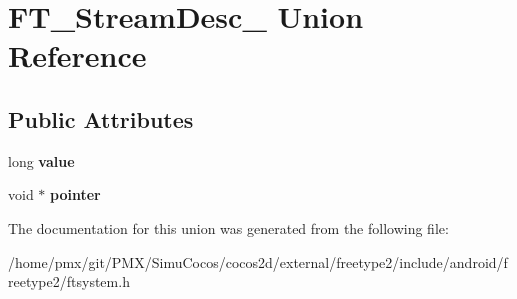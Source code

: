 \hypertarget{unionFT__StreamDesc__}{}\section{F\+T\+\_\+\+Stream\+Desc\+\_\+ Union Reference}
\label{unionFT__StreamDesc__}
\subsection*{Public Attributes}
\begin{DoxyCompactItemize}
\item 
\mbox{\label{unionFT__StreamDesc___a1a94493032faef1c3ed7bc33816ce90c}} 
long {\bfseries value}
\item 
\mbox{\label{unionFT__StreamDesc___aad205cc1e49a8b4d0f51e10f98d5d453}} 
void $\ast$ {\bfseries pointer}
\end{DoxyCompactItemize}


The documentation for this union was generated from the following file\+:\begin{DoxyCompactItemize}
\item 
/home/pmx/git/\+P\+M\+X/\+Simu\+Cocos/cocos2d/external/freetype2/include/android/freetype2/ftsystem.\+h\end{DoxyCompactItemize}
